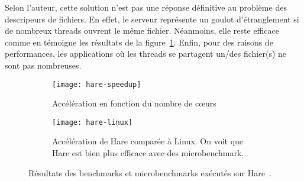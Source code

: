       Selon l'auteur, cette solution n'est pas une réponse définitive au
      problème des descripeurs de fichiers. En effet, le serveur représente un
      goulot d'étranglement si de nombreux threads ouvrent le même
      fichier. Néanmoins, elle reste efficace comme en témoigne les résultats de
      la figure~\ref{fig:hare-res}. Enfin, pour des raisons de performances, les
      applications où les threads se partagent un/des fichier(s) ne sont pas
      nombreuses.\\

      \begin{figure}[ht]
        \begin{subfigure}[b]{0.5\textwidth}
          \texttt{[image: hare-speedup]}
          \caption{Accélération en fonction du nombre de c\oe urs}
        \end{subfigure}
        \begin{subfigure}[b]{0.5\textwidth}
          \texttt{[image: hare-linux]}
          \caption{Accélération de Hare comparée à Linux. On voit que Hare est
            bien plus efficace avec des microbenchmark.}
        \end{subfigure}
        \caption{Résultats des benchmarks et microbenchmarks exécutés sur
          Hare~\citep{gruenwald2014providing}.}
        \label{fig:hare-res}
      \end{figure}

